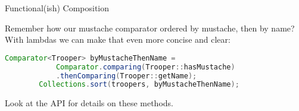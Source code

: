 \documentclass{beamer}
\begin{document}
\begin{frame}[fragile]{Functional(ish) Composition}

Remember how our mustache comparator ordered by mustache, then by name?\\

With lambdas we can make that even more concise and clear:

\begin{lstlisting}[language=Java]
        Comparator<Trooper> byMustacheThenName =
            Comparator.comparing(Trooper::hasMustache)
            .thenComparing(Trooper::getName);
        Collections.sort(troopers, byMustacheThenName);
\end{lstlisting}

Look at the  API for details on these methods.

\end{frame}







\end{document}
